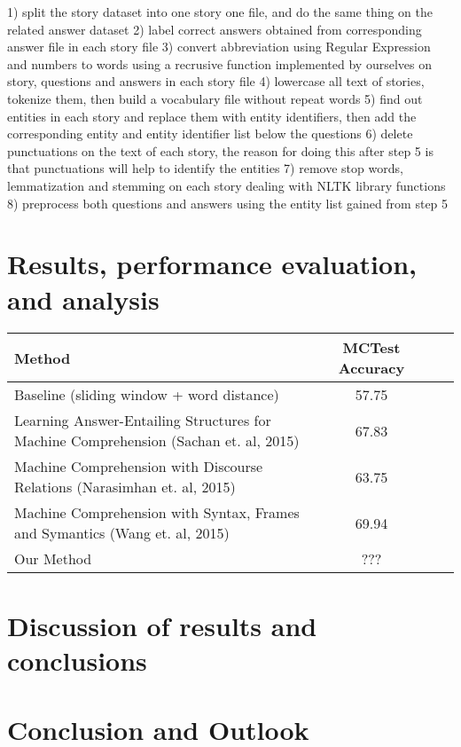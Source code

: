 \documentclass[runningheads,a4paper]{llncs}
\begin{document}
1) split the story dataset into one story one file, and do the same thing on the related answer dataset 
2) label correct answers obtained from corresponding answer file
in each story file 
3) convert abbreviation using Regular Expression and numbers to words using a recrusive function implemented by ourselves on story, questions and answers in each story file 
4) lowercase all text of stories, tokenize them, then build a vocabulary file without repeat words
5) find out entities in each story and replace them with entity identifiers, then add the corresponding entity and entity identifier list below the questions
6) delete punctuations on the text of each story, the reason for doing this after step 5 is that punctuations will help to identify the entities 
7) remove stop words, lemmatization and stemming on each story dealing with NLTK library functions
8) preprocess both questions and answers using the entity list gained from step 5




\section{Results, performance evaluation, and analysis}

\begin{tabular}
	{l*{2}{c}r}   	 Method  & MCTest Accuracy  \\ \hline
	Baseline (sliding window + word distance) & 57.75 \\ 
	Learning Answer-Entailing Structures for Machine Comprehension (Sachan et. al, 2015) & 67.83\\
	Machine Comprehension with Discourse Relations (Narasimhan et. al, 2015) & 63.75\\
	Machine Comprehension with Syntax, Frames and Symantics (Wang et. al, 2015) & 69.94\\
	Our Method & ???\\
	
\end{tabular}

\section{Discussion of results and conclusions}


\section{Conclusion and Outlook}
\end{document}
